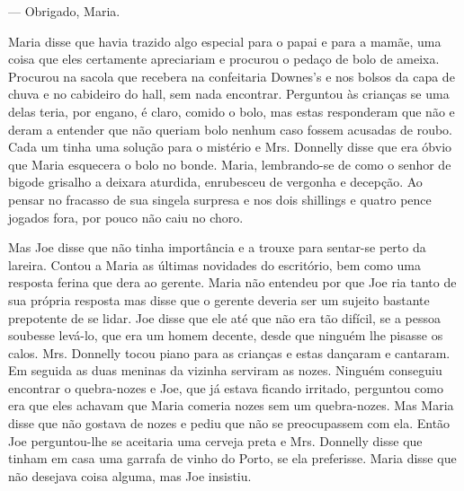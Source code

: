 --- Obrigado, Maria.

Maria disse que havia trazido algo especial para o papai e para a
mamãe, uma coisa que eles certamente apreciariam e procurou o pedaço
de bolo de ameixa. Procurou na sacola que recebera na confeitaria
Downes's e nos bolsos da capa de chuva e no cabideiro do hall, sem
nada encontrar. Perguntou às crianças se uma delas teria, por engano,
é claro, comido o bolo, mas estas responderam que não e deram a
entender que não queriam bolo nenhum caso fossem acusadas de roubo.
Cada um tinha uma solução para o mistério e Mrs. Donnelly disse que
era óbvio que Maria esquecera o bolo no bonde. Maria, lembrando-se de
como o senhor de bigode grisalho a deixara aturdida, enrubesceu de
vergonha e decepção. Ao pensar no fracasso de sua singela surpresa e
nos dois shillings e quatro pence jogados fora, por pouco não caiu no
choro.

Mas Joe disse que não tinha importância e a trouxe para sentar-se
perto da lareira. Contou a Maria as últimas novidades do escritório,
bem como uma resposta ferina que dera ao gerente. Maria não entendeu
por que Joe ria tanto de sua própria resposta mas disse que o gerente
deveria ser um sujeito bastante prepotente de se lidar. Joe disse que
ele até que não era tão difícil, se a pessoa soubesse levá-lo, que era
um homem decente, desde que ninguém lhe pisasse os calos. Mrs.
Donnelly tocou piano para as crianças e estas dançaram e cantaram.
Em seguida as duas meninas da vizinha serviram as nozes. Ninguém
conseguiu encontrar o quebra-nozes e Joe, que já estava ficando
irritado, perguntou como era que eles achavam que Maria comeria nozes
sem um quebra-nozes. Mas Maria disse que não gostava de nozes e pediu
que não se preocupassem com ela. Então Joe perguntou-lhe se aceitaria
uma cerveja preta e Mrs. Donnelly disse que tinham em casa uma garrafa
de vinho do Porto, se ela preferisse. Maria disse que não desejava
coisa alguma, mas Joe insistiu.

